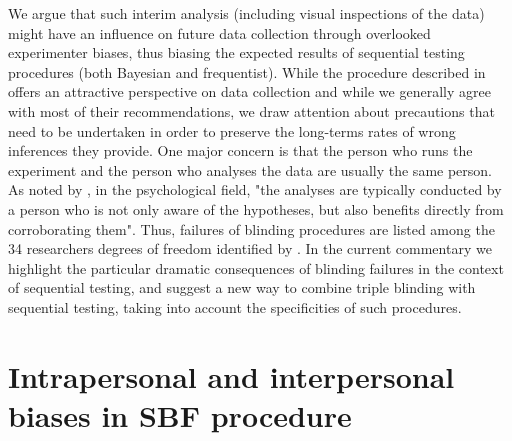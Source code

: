 \documentclass[a4paper,man,natbib,floatsintext,donotrepeattitle]{apa6}
\begin{document}
We argue that such interim analysis (including visual inspections of the data) might have an influence on future data collection through overlooked experimenter biases, thus biasing the expected results of sequential testing procedures (both Bayesian and frequentist). While the procedure described in \cite{schonbrodt_sequential_2017} offers an attractive perspective on data collection and while we generally agree with most of their recommendations, we draw attention about precautions that need to be undertaken in order to preserve the long-terms rates of wrong inferences they provide. One major concern is that the person who runs the experiment and the person who analyses the data are usually the same person. As noted by \cite{wicherts_degrees_2016}, in the psychological field, "the analyses are typically conducted by a person who is not only aware of the hypotheses, but also benefits directly from corroborating them". Thus, failures of blinding procedures are listed among the 34 researchers degrees of freedom identified by \cite{wicherts_degrees_2016}. In the current commentary we highlight the particular dramatic consequences of blinding failures in the context of sequential testing, and suggest a new way to combine triple blinding with sequential testing, taking into account the specificities of such procedures.


\section{Intrapersonal and interpersonal biases in SBF procedure}
\end{document}

